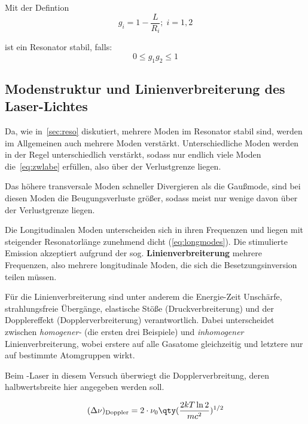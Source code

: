 \documentclass[slug=GL, room=HZDR\ Dresden/Rossendorf\,\ Geb.\ 620/123, supervisor=Tim\ Ziegler]{../../Lab_Report_LaTeX/lab_report}
\newcommand{\hne}{\ce{HeNe}-Laser}
\begin{document}
Mit der Defintion
\begin{equation}
  \label{eq:gparams}
  g_i=1-\frac{L}{R_i};\; i=1,2
\end{equation}

ist ein Resonator stabil, falls:
\begin{equation}
  \label{eq:stabbed}
  0\leq g_1g_2\leq 1
\end{equation}

\subsection{Modenstruktur und Linienverbreiterung des Laser-Lichtes}
\label{ref:linv}

Da, wie in~\ref{sec:reso} diskutiert, mehrere Moden im Resonator
stabil sind, werden im Allgemeinen auch mehrere Moden verst\"arkt.
Unterschiedliche Moden werden in der Regel unterschiedlich
verst\"arkt, sodass nur endlich viele Moden die~\ref{eq:zwlabe}
erf\"ullen, also \"uber der Verlustgrenze liegen.

Das h\"ohere transversale Moden schneller Divergieren als die
Gau\ss{}mode, sind bei diesen Moden die Beugungsverluste gr\"o\ss{}er,
sodass meist nur wenige davon \"uber der Verlustgrenze liegen. 

Die Longitudinalen Moden unterscheiden sich in ihren Frequenzen und
liegen mit steigender Resonatorl\"ange zunehmend dicht
(\ref{eq:longmodes}). Die stimulierte Emission akzeptiert aufgrund der
sog. \textbf{Linienverbreiterung} mehrere Frequenzen, also mehrere
longitudinale Moden, die sich die Besetzungsinversion teilen m\"ussen.

F\"ur die Linienverbreiterung sind unter anderem die Energie-Zeit
Unsch\"arfe, strahlungsfreie \"Uberg\"ange, elastische St\"o\ss{}e
(Druckverbreiterung) und der Dopplereffekt (Dopplerverbreiterung)
verantwortlich. Dabei unterscheidet zwischen \textit{homogener-} (die
ersten drei Beispiele) und \textit{inhomogener} Linienverbreiterung,
wobei erstere auf alle Gasatome gleichzeitig und letztere nur auf
bestimmte Atomgruppen wirkt. 

Beim \hne{} in diesem Versuch \"uberwiegt die Dopplerverbreitung,
deren halbwertsbreite hier angegeben werden soll.

\begin{equation}
  \label{eq:doppler}
  (\Delta\nu)_{\text{Doppler}}=2\cdot \nu_0\qty(\frac{2kT\ln{2}}{mc^2})^{1/2}
\end{equation}
\end{document}

